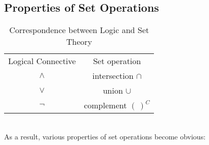 \documentclass[10pt]{article}
\begin{document}
	\subsection{Properties of Set Operations}
	\begin{table}[h!]
		\centering
		\caption*{Correspondence between Logic and Set Theory}
		\begin{tabular}{|c|c|}
			\cline{1-2}
			Logical Connective & Set operation \\ \cline{1-2}
			$\land$ & intersection $\cap$ \\ \cline{1-2}
			$\lor$ & union $\cup$ \\ \cline{1-2}
			$\lnot$ & complement $(~)^C$ \\ \cline{1-2}
		\end{tabular}
	\end{table}
	~\\
	As a result, various properties of set operations become obvious:
\end{document}
